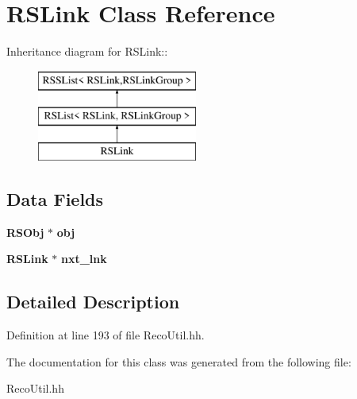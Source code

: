 \section{RSLink Class Reference}
\label{classRSLink}
Inheritance diagram for RSLink::\begin{figure}[H]
\begin{center}
\leavevmode
\includegraphics[height=3cm]{classRSLink}
\end{center}
\end{figure}
\subsection*{Data Fields}
\begin{DoxyCompactItemize}
\item 
{\bf RSObj} $\ast$ {\bfseries obj}\label{classRSLink_a3f082748a6ac0ba61e9b49702cde4951}

\item 
{\bf RSLink} $\ast$ {\bfseries nxt\_\-lnk}\label{classRSLink_a8aab02c64d735f834952fd298e805074}

\end{DoxyCompactItemize}


\subsection{Detailed Description}


Definition at line 193 of file RecoUtil.hh.

The documentation for this class was generated from the following file:\begin{DoxyCompactItemize}
\item 
RecoUtil.hh\end{DoxyCompactItemize}
